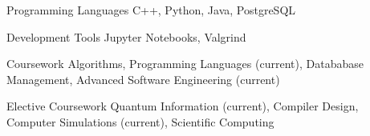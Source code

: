 


\begin{cvskills}

  \cvskill
    {Programming Languages}
    {C++, Python, Java, PostgreSQL}

  \cvskill
    {Development Tools}
    {Jupyter Notebooks, Valgrind}

  \cvskill
    {Coursework}
    {Algorithms, Programming Languages (current), Datababase Management, Advanced Software Engineering (current)}

  \cvskill
    {Elective Coursework}
    {Quantum Information (current), Compiler Design, Computer Simulations (current), Scientific Computing}

\end{cvskills}
